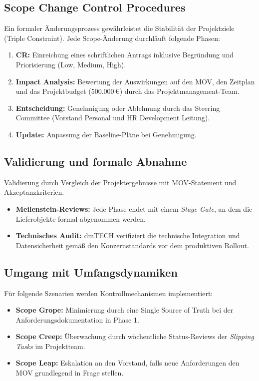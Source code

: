 \subsection{Scope Change Control Procedures}
Ein formaler Änderungsprozess gewährleistet die Stabilität der Projektziele (Triple Constraint). Jede Scope-Änderung durchläuft folgende Phasen:
\begin{enumerate}
    \item \textbf{\ac{CR}:} Einreichung eines schriftlichen Antrags inklusive Begründung und Priorisierung (Low, Medium, High).
    \item \textbf{Impact Analysis:} Bewertung der Auswirkungen auf den \ac{MOV}, den Zeitplan und das Projektbudget (500.000\,€) durch das Projektmanagement-Team.
    \item \textbf{Entscheidung:} Genehmigung oder Ablehnung durch das Steering Committee (Vorstand Personal und \acs{HR} Development Leitung).
    \item \textbf{Update:} Anpassung der Baseline-Pläne bei Genehmigung.
\end{enumerate}

\subsection{Validierung und formale Abnahme}
Validierung durch Vergleich der Projektergebnisse mit \ac{MOV}-Statement und Akzeptanzkriterien.
\begin{itemize}
    \item \textbf{Meilenstein-Reviews:} Jede Phase endet mit einem \textit{Stage Gate}, an dem die Lieferobjekte formal abgenommen werden.
    \item \textbf{Technisches Audit:} \acs{dmTECH} verifiziert die technische Integration und Datensicherheit gemäß den Konzernstandards vor dem produktiven Rollout.
\end{itemize}

\subsection{Umgang mit Umfangsdynamiken}
Für folgende Szenarien werden Kontrollmechanismen implementiert:
\begin{itemize}
    \item \textbf{Scope Grope:} Minimierung durch eine Single Source of Truth bei der Anforderungsdokumentation in Phase 1.
    \item \textbf{Scope Creep:} Überwachung durch wöchentliche Status-Reviews der \textit{Slipping Tasks} im Projektteam.
    \item \textbf{Scope Leap:} Eskalation an den Vorstand, falls neue Anforderungen den \ac{MOV} grundlegend in Frage stellen.
\end{itemize}

